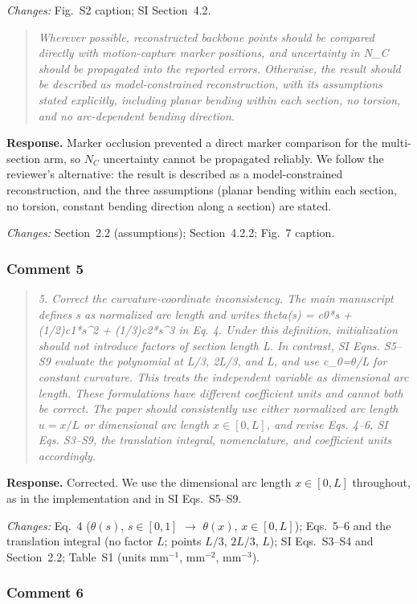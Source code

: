 \documentclass[11pt,a4paper]{article}
\newcommand{\rc}[1]{\begin{quote}\color{black!70}\itshape #1\end{quote}}
\begin{document}
\textit{Changes:} Fig.~S2 caption; SI Section~4.2.

\rc{Wherever possible, reconstructed backbone points should be compared directly with motion-capture marker positions, and uncertainty in N\_C should be propagated into the reported errors. Otherwise, the result should be described as model-constrained reconstruction, with its assumptions stated explicitly, including planar bending within each section, no torsion, and no arc-dependent bending direction.}
\textbf{Response.} Marker occlusion prevented a direct marker comparison for the multi-section arm, so $N_C$ uncertainty cannot be propagated reliably. We follow the reviewer's alternative: the result is described as a model-constrained reconstruction, and the three assumptions (planar bending within each section, no torsion, constant bending direction along a section) are stated.

\textit{Changes:} Section~2.2 (assumptions); Section~4.2.2; Fig.~7 caption.

\subsubsection*{Comment 5}

\rc{5. Correct the curvature-coordinate inconsistency. The main manuscript defines s as normalized arc length and writes theta(s) = c0*s + (1/2)c1*s\^{}2 + (1/3)c2*s\^{}3 in Eq. 4. Under this definition, initialization should not introduce factors of section length L. In contrast, SI Eqns. S5--S9 evaluate the polynomial at L/3, 2L/3, and L, and use c\_0=$\theta$/L for constant curvature. This treats the independent variable as dimensional arc length. These formulations have different coefficient units and cannot both be correct. The paper should consistently use either normalized arc length $u = x/L$ or dimensional arc length $x \in [0, L]$, and revise Eqs. 4--6, SI Eqs. S3--S9, the translation integral, nomenclature, and coefficient units accordingly.}
\textbf{Response.} Corrected. We use the dimensional arc length $x \in [0, L]$ throughout, as in the implementation and in SI Eqs.~S5--S9.

\textit{Changes:} Eq.~4 ($\theta(s)$, $s \in [0, 1]$ $\to$ $\theta(x)$, $x \in [0, L]$); Eqs.~5--6 and the translation integral (no factor $L$; points $L/3$, $2L/3$, $L$); SI Eqs.~S3--S4 and Section~2.2; Table~S1 (units mm$^{-1}$, mm$^{-2}$, mm$^{-3}$).

\subsubsection*{Comment 6}
\end{document}
